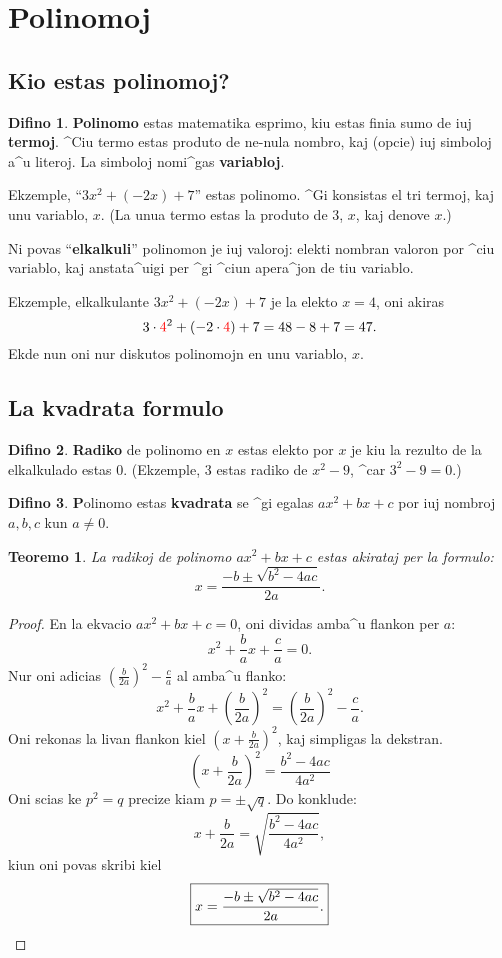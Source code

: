 \documentclass[12pt,a4paper]{article}
\theoremstyle{plain}\newtheorem*{mythm}{Teoremo}
\theoremstyle{definition}\newtheorem*{mydef}{Difino}
\newcommand{\red}[1]{{\color{red}#1}}
\begin{document}
\section{Polinomoj}
\subsection{Kio estas polinomoj?}
\begin{mydef}
	\textbf{Polinomo} estas matematika esprimo, kiu estas finia sumo de iuj \textbf{termoj}. ^Ciu termo estas produto de ne-nula nombro, kaj (opcie) iuj simboloj a^u literoj. La simboloj nomi^gas \textbf{variabloj}.
\end{mydef}

Ekzemple, ``$3x^2 + (-2x) + 7$'' estas polinomo. ^Gi konsistas el tri termoj, kaj unu variablo, $x$. (La unua termo estas la produto de $3$, $x$, kaj denove $x$.)

Ni povas ``\textbf{elkalkuli}'' polinomon je iuj valoroj: elekti nombran valoron por ^ciu variablo, kaj anstata^uigi per ^gi ^ciun apera^jon de tiu variablo.

Ekzemple, elkalkulante $3x^2 + (-2x) + 7$ je la elekto $x=4$, oni akiras \[
	3 \cdot \red{4}^2 + (-2 \cdot \red{4}) + 7 = 48 - 8 + 7 = 47.
\]
Ekde nun oni nur diskutos polinomojn en unu variablo, $x$.

\subsection{La kvadrata formulo}
\begin{mydef}
	\textbf{Radiko} de polinomo en $x$ estas elekto por $x$ je kiu la rezulto de la elkalkulado estas $0$. (Ekzemple, 3 estas radiko de $x^2 - 9$, ^car $3^2 - 9 = 0$.)
\end{mydef}

\begin{mydef}
	\textbf Polinomo estas \textbf{kvadrata} se ^gi egalas $ax^2 + bx + c$ por iuj nombroj $a, b, c$ kun $a \neq 0$.
\end{mydef}

\begin{mythm}
	La radikoj de polinomo $a x^2 + b x + c$ estas akirataj per la formulo: \[
		\boxed{x = \frac{-b \pm \sqrt{b^2-4ac}}{2a}.}
	\]
\end{mythm}

\begin{proof}
	En la ekvacio $a x^2 + b x + c = 0$, oni dividas amba^u flankon per $a$: \[
		x^2 + \frac{b}{a} x + \frac{c}{a} = 0.
	\]
	Nur oni adicias $\left( \frac{b}{2a} \right)^2 - \frac{c}{a}$ al amba^u flanko: \[
		x^2 + \frac{b}{a} x + \left( \frac{b}{2a} \right)^2 = \left( \frac{b}{2a} \right)^2 - \frac{c}{a}.
	\]
	Oni rekonas la livan flankon kiel $(x + \frac{b}{2a})^2$, kaj simpligas la dekstran. \[
		\left(x + \frac{b}{2a}\right)^2 = \frac{b^2 - 4ac}{4a^2}
	\]
	Oni scias ke $p^2 = q$ precize kiam $p = \pm \sqrt{q}$. Do konklude: \[
		x + \frac{b}{2a} = \sqrt{\frac{b^2 - 4ac}{4a^2}},
	\]
	kiun oni povas skribi kiel \[
		\boxed{x = \frac{-b \pm \sqrt{b^2 - 4ac}}{2a}.} \qedhere
	\]
\end{proof}
\end{document}
